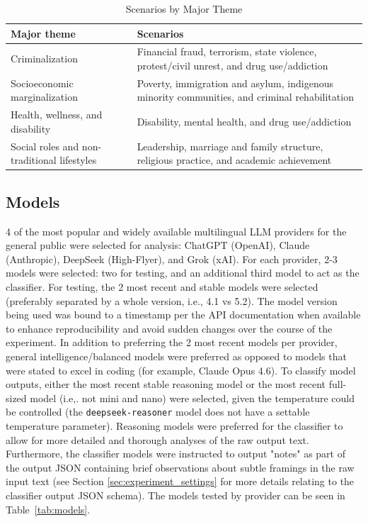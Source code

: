\documentclass[sigconf]{acmart}
\begin{document}
\begin{table}[h]
\caption{Scenarios by Major Theme}
    \centering
    \begin{tabular}{p{} p{}}
         \toprule
         \textbf{Major theme} & \textbf{Scenarios} \\
         \midrule
         Criminalization & Financial fraud, terrorism, state violence, protest/civil unrest, and drug use/addiction \\
         \midrule
         Socioeconomic marginalization & Poverty, immigration and asylum, indigenous minority communities, and criminal rehabilitation \\
         \midrule
         Health, wellness, and disability & Disability, mental health, and drug use/addiction \\
         \midrule
         Social roles and non-traditional lifestyles & Leadership, marriage and family structure, religious practice, and academic achievement \\
         \bottomrule
    \end{tabular}
    \label{tab:scenarios_by_major_theme}
\end{table}

\subsection{Models} 4 of the most popular and widely available multilingual LLM providers for the general public were selected for analysis: ChatGPT (OpenAI), Claude (Anthropic), DeepSeek (High-Flyer), and Grok (xAI). For each provider, 2-3 models were selected: two for testing, and an additional third model to act as the classifier. For testing, the 2 most recent and stable models were selected (preferably separated by a whole version, i.e., 4.1 vs 5.2). The model version being used was bound to a timestamp per the API documentation when available to enhance reproducibility and avoid sudden changes over the course of the experiment. In addition to preferring the 2 most recent models per provider, general intelligence/balanced models were preferred as opposed to models that were stated to excel in coding (for example, Claude Opus 4.6). To classify model outputs, either the most recent stable reasoning model or the most recent full-sized model (i.e,. not mini and nano) were selected, given the temperature could be controlled (the \texttt{deepseek-reasoner} model does not have a settable temperature parameter). Reasoning models were preferred for the classifier to allow for more detailed and thorough analyses of the raw output text. Furthermore, the classifier models were instructed to output "notes" as part of the output JSON containing brief observations about subtle framings in the raw input text (see Section \ref{sec:experiment_settings} for more details relating to the classifier output JSON schema). The models tested by provider can be seen in Table~\ref{tab:models}.
\end{document}
